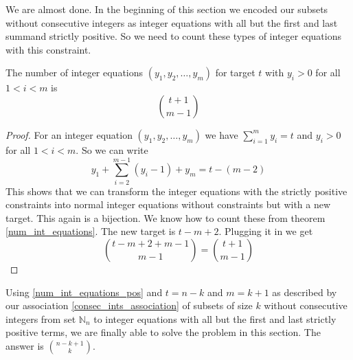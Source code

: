 We are almost done. In the beginning of this section we encoded our subsets without consecutive integers as integer equations with all but the first and last summand strictly positive. So we need to count these types of integer equations with this constraint.

\begin{thm}\label{num_int_equations_pos}
The number of integer equations $(y_1, y_2, \ldots, y_m)$ for target $t$ with $y_i > 0$ for all $1 < i < m$ is 
$$
\binom{t + 1}{m - 1}
$$
\end{thm}

\begin{proof}
For an integer equation $(y_1, y_2, \ldots, y_m)$ we have $\sum_{i = 1}^m y_i = t$ and $y_i > 0$ for all $1 < i < m$. So we can write
$$
y_1 + \sum_{i = 2}^{m-1} (y_i - 1) + y_m = t - (m - 2)
$$
This shows that we can transform the integer equations with the strictly positive constraints into normal integer equations without constraints but with a new target. This again is a bijection. We know how to count these from theorem \ref{num_int_equations}. The new target is $t - m + 2$. Plugging it in we get 
$$
\binom{t - m + 2 + m - 1}{m - 1} = \binom{t + 1}{m - 1}
$$
\end{proof}

Using \ref{num_int_equations_pos} and $t = n - k$ and $m = k + 1$ as described by our association \ref{consec_ints_association} of subsets of size $k$ without consecutive integers from set $\mathbb{N}_n$ to integer equations with all but the first and last strictly positive terms, we are finally able to solve the problem in this section. The answer is $\binom{n - k + 1}{k}$.






